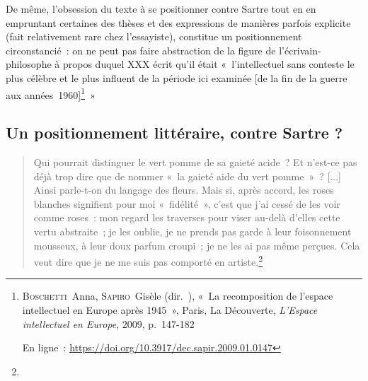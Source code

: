 \documentclass[12pt, a4paper]{article}
\begin{document}

De même, l'obsession du texte à se positionner contre Sartre tout en en empruntant certaines des thèses et des expressions de manières parfois explicite (fait relativement rare chez l'essayiste), constitue un positionnement circonstancié~: on ne peut pas faire abstraction de la figure de l'écrivain-philosophe à propos duquel XXX écrit qu'il était «~l’intellectuel sans conteste le plus célèbre et le plus influent de la période ici examinée [de la fin de la guerre aux années~1960]\footnote{\textsc{Boschetti}~Anna, \textsc{Sapiro}~Gisèle (dir.~), «~La recomposition de l'espace intellectuel en Europe après 1945~», Paris, La Découverte, \textit{L'Espace intellectuel en Europe}, 2009, p.~147-182

En ligne~: \href{https://doi.org/10.3917/dec.sapir.2009.01.0147}{https://doi.org/10.3917/dec.sapir.2009.01.0147}}~»

\subsection{Un positionnement littéraire, contre Sartre ?}
\label{vsSartre}










\begin{quote}
    Qui pourrait distinguer le vert pomme de sa gaieté acide~? Et n'est-ce pas déjà trop dire que de nommer «~la gaieté aide du vert pomme~»~? [...] Ainsi parle-t-on du langage des fleurs. Mais si, après accord, les roses blanches signifient pour moi «~fidélité~», c'est que j'ai cessé de les voir comme roses~: mon regard les traverses pour viser au-delà d'elles cette vertu abstraite~; je les oublie, je ne prends pas garde à leur foisonnement mousseux, à leur doux parfum croupi~; je ne les ai pas même perçues. Cela veut dire que je ne me suis pas comporté en artiste.\footnote{}
\end{quote}
\end{document}
